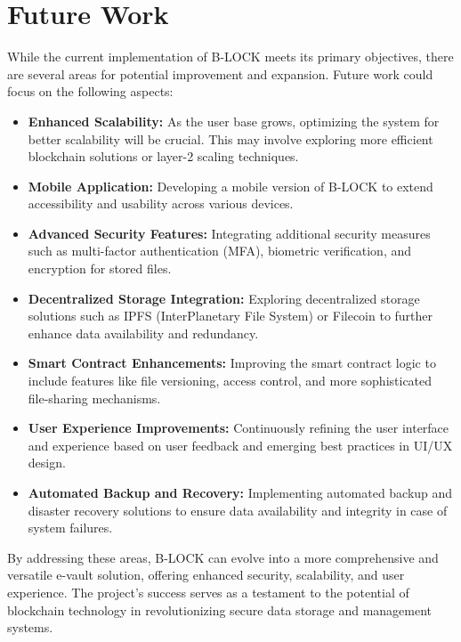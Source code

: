 \documentclass[12pt,a4paper]{report}
\begin{document}
\section{Future Work}
While the current implementation of B-LOCK meets its primary objectives, there are several areas for potential improvement and expansion. Future work could focus on the following aspects:
\begin{itemize}
   \item \textbf{Enhanced Scalability:} As the user base grows, optimizing the system for better scalability will be crucial. This may involve exploring more efficient blockchain solutions or layer-2 scaling techniques.
   \item \textbf{Mobile Application:} Developing a mobile version of B-LOCK to extend accessibility and usability across various devices.
   \item \textbf{Advanced Security Features:} Integrating additional security measures such as multi-factor authentication (MFA), biometric verification, and encryption for stored files.
   \item \textbf{Decentralized Storage Integration:} Exploring decentralized storage solutions such as IPFS (InterPlanetary File System) or Filecoin to further enhance data availability and redundancy.
   \item \textbf{Smart Contract Enhancements:} Improving the smart contract logic to include features like file versioning, access control, and more sophisticated file-sharing mechanisms.
   \item \textbf{User Experience Improvements:} Continuously refining the user interface and experience based on user feedback and emerging best practices in UI/UX design.
   \item \textbf{Automated Backup and Recovery:} Implementing automated backup and disaster recovery solutions to ensure data availability and integrity in case of system failures.
\end{itemize}
By addressing these areas, B-LOCK can evolve into a more comprehensive and versatile e-vault solution, offering enhanced security, scalability, and user experience. The project's success serves as a testament to the potential of blockchain technology in revolutionizing secure data storage and management systems.






\newpage

\pagestyle{plain}
\renewcommand{\bibname}{References}


\printbibliography
\end{document}
